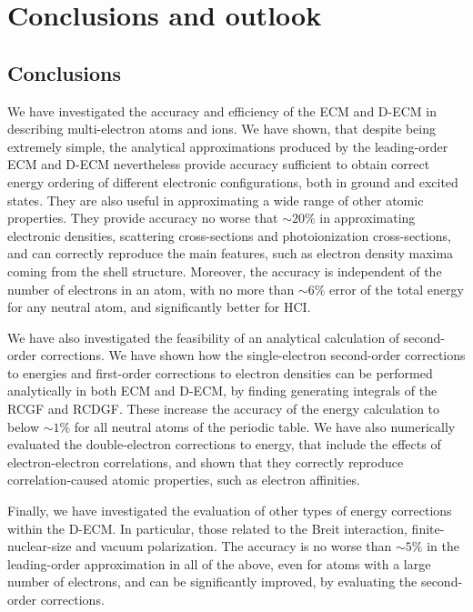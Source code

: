 \chapter{Conclusions and outlook}
\label{ch:Conclusions}

\section{Conclusions}
\label{sec:conclusions}

We have investigated the accuracy and efficiency of the ECM and D-ECM in
describing multi-electron atoms and ions. We have shown, that despite being extremely simple, the analytical approximations produced by the leading-order ECM and D-ECM nevertheless provide accuracy sufficient to obtain correct energy ordering of different electronic configurations, both in ground and excited states. They are also useful in approximating a wide range of other atomic properties. They provide accuracy no worse that $\sim 20\%$ in approximating electronic densities, scattering cross-sections and photoionization cross-sections, and can correctly reproduce the main features, such as electron density maxima coming from the shell structure. Moreover, the accuracy is independent of the number of electrons in an atom, with no more than $\sim 6\%$ error of the total energy for any neutral atom, and significantly better for HCI.

We have also investigated the feasibility of an analytical calculation of second-order corrections. We have shown how the single-electron second-order corrections to energies and first-order corrections to electron densities can be performed analytically in both ECM and D-ECM, by finding generating integrals of the RCGF and RCDGF. These increase the accuracy of the energy calculation to below $\sim 1\%$ for all neutral atoms of the periodic table. We have also numerically evaluated the double-electron corrections to energy, that include the effects of electron-electron correlations, and shown that they correctly reproduce correlation-caused atomic properties, such as electron affinities.

Finally, we have investigated the evaluation of other types of energy corrections within the D-ECM. In particular, those related to the Breit interaction, finite-nuclear-size and vacuum polarization. The accuracy is no worse than $ \sim 5 \%$ in the leading-order approximation in all of the above, even for atoms with a large number of electrons, and can be significantly improved, by evaluating the second-order corrections.

